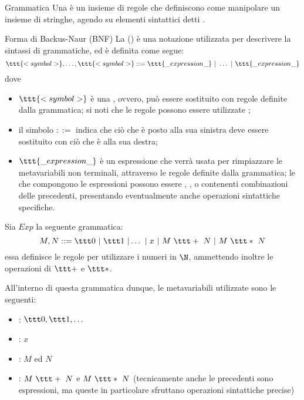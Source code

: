 \documentclass[a4paper, 12pt]{report}
\begin{document}
    \begin{frameddefn}{Grammatica}
        Una  è un insieme di regole che definiscono come manipolare un insieme di stringhe, agendo su elementi sintattici detti .
    \end{frameddefn}

    \begin{frameddefn}{Forma di Backus-Naur (BNF)}
        La  () è una notazione utilizzata per descrivere la sintassi di grammatiche, ed è definita come segue: $$\ttt{<symbol>}, \ldots, \ttt{<symbol>} ::= \ttt{\_expression\_} \ | \ \ldots \ | \ \ttt{\_expression\_}$$ dove
        \begin{itemize}
            \item $\ttt{<symbol>}$ è una , ovvero, può essere sostituito con regole definite dalla grammatica; si noti che le regole possono essere utilizzate ;
            \item il simbolo $::=$ indica che ciò che è posto alla sua sinistra deve essere sostituito con ciò che è alla sua destra;
            \item $\ttt{\_expression\_}$ è un espressione che verrà usata per rimpiazzare le metavariabili non terminali, attraverso le regole definite dalla grammatica; le  che compongono le espressioni possono essere , ,  o  contenenti combinazioni delle precedenti, presentando eventualmente anche operazioni sintattiche specifiche.
        \end{itemize}
    \end{frameddefn}

    \begin{example}
        \label{exp}
        Sia $Exp$ la seguente grammatica: $$M, N ::= \ttt 0 \ | \ \ttt 1 \ | \ldots \ | \ x \ | \ M \ \ttt + \ N \ | \ M \ \ttt * \ N$$ essa definisce le regole per utilizzare i numeri in $\N$, ammettendo inoltre le operazioni  di $\ttt +$ e $\ttt *$.

        All'interno di questa grammatica dunque, le metavariabili utilizzate sono le seguenti:
        \begin{itemize}
            \item {}: $\ttt 0, \ttt 1,  \ldots$
            \item {}: $x$
            \item {}: $M$ ed $N$
            \item {}: $M \ \ttt + \ N$ e $M \ \ttt * \ N$ (tecnicamente anche le precedenti sono espressioni, ma queste in particolare sfruttano operazioni sintattiche precise)
        \end{itemize}
    \end{example}
\end{document}
